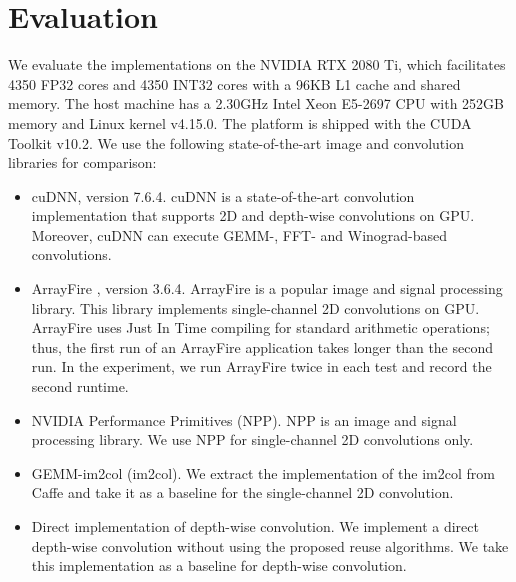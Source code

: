 \section{Evaluation}
\label{exp}
We evaluate the implementations on the NVIDIA RTX 2080 Ti, which facilitates 4350 FP32 cores and 4350 INT32 cores with a 96KB L1 cache and shared memory. The host machine has a 2.30GHz Intel Xeon E5-2697
CPU with 252GB memory and Linux kernel v4.15.0. The platform is shipped with the CUDA Toolkit v10.2. We use the following state-of-the-art image and convolution libraries for comparison:
\begin{itemize}
  \item cuDNN, version 7.6.4. cuDNN is a state-of-the-art convolution implementation that supports 2D and depth-wise convolutions on GPU.
      Moreover, cuDNN can execute GEMM-, FFT- and Winograd-based convolutions.
  \item ArrayFire \cite{Yalamanchili2015}, version 3.6.4. ArrayFire is a popular image and signal processing library. This library implements single-channel 2D convolutions on GPU. ArrayFire uses Just In Time compiling for standard arithmetic operations; thus, the first run of an ArrayFire application takes longer than the second run.
      In the experiment, we run ArrayFire twice in each test and record the second runtime.
  \item NVIDIA Performance Primitives (NPP). NPP is an image and signal processing library. We use NPP for single-channel 2D convolutions only.
  \item GEMM-im2col (im2col). We extract the implementation of the im2col from Caffe \cite{jia2014caffe} and take it as a baseline for the single-channel 2D convolution.
  \item Direct implementation of depth-wise convolution. We implement a direct depth-wise convolution without using the proposed reuse algorithms. We take this implementation as a baseline for depth-wise convolution.

\end{itemize}



